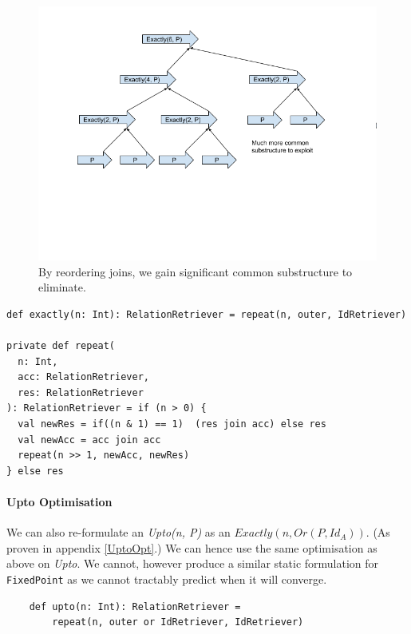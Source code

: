 \documentclass[12pt,a4paper,twoside,openright]{report}
\newcommand\codeName[1]{\texttt{#1}}
\newcommand\mathName[1]{\textit{#1}}
\renewcommand{\baselinestretch}{1.1}    %
\let\oldparagraph\paragraph
\renewcommand{\paragraph}[1]{\oldparagraph{#1}\mbox{}}
\begin{document}
\begin{figure}[ht]
\centering
  \includegraphics[width=\textwidth]{figs/CommonJoins.png}
  \caption{By reordering joins, we gain significant common substructure to eliminate.}
  \label{fig:CommonJoins}
\end{figure}

\renewcommand{\baselinestretch}{0.8}
\begin{framed}
\begin{verbatim}
def exactly(n: Int): RelationRetriever = repeat(n, outer, IdRetriever)

private def repeat(
  n: Int,
  acc: RelationRetriever,
  res: RelationRetriever
): RelationRetriever = if (n > 0) {
  val newRes = if((n & 1) == 1)  (res join acc) else res
  val newAcc = acc join acc
  repeat(n >> 1, newAcc, newRes)
} else res
\end{verbatim}
\end{framed}
\renewcommand{\baselinestretch}{1.1}

		\paragraph{Upto Optimisation}
			We can also re-formulate an \mathName{Upto(n, P)} as an \mathName{$Exactly(n, Or(P, Id_A))$}. (As proven in appendix \ref{UptoOpt}.) We can hence use the same optimisation as above on \mathName{Upto}. We cannot, however produce a similar static formulation for \codeName{FixedPoint} as we cannot tractably predict when it will converge.
			
			\renewcommand{\baselinestretch}{0.8}
			\begin{framed}
			\begin{verbatim}			
    def upto(n: Int): RelationRetriever =
        repeat(n, outer or IdRetriever, IdRetriever)
			\end{verbatim}
			\end{framed}
			\renewcommand{\baselinestretch}{1.1}
\end{document}
